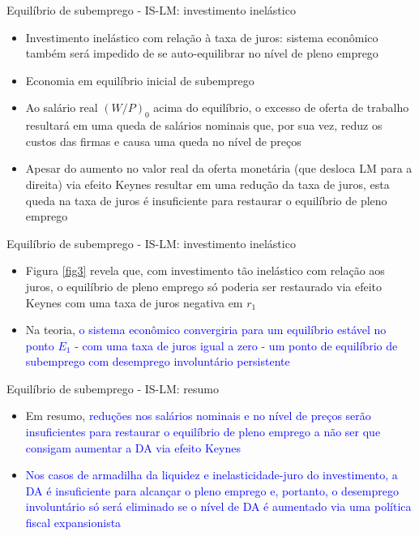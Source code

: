 \documentclass[10pt]{beamer}
\begin{document}
\begin{frame}{Equilíbrio de subemprego - IS-LM: investimento inelástico}
    \begin{itemize}
        \item Investimento inelástico com relação à taxa de juros: sistema econômico também será impedido de se auto-equilibrar no nível de pleno emprego
        \bigskip
        \item Economia em equilíbrio inicial de subemprego
        \bigskip
        \item Ao salário real $(W/P)_0$ acima do equilíbrio, o excesso de oferta de trabalho resultará em uma queda de salários nominais que, por sua vez, reduz os custos das firmas e causa uma queda no nível de preços
        \bigskip
        \item Apesar do aumento no valor real da oferta monetária (que desloca LM para a direita) via efeito Keynes resultar em uma redução da taxa de juros, esta queda na taxa de juros é insuficiente para restaurar o equilíbrio de pleno emprego
    \end{itemize}
\end{frame}

\begin{frame}{Equilíbrio de subemprego - IS-LM: investimento inelástico}
    \begin{itemize}
        \item Figura \ref{fig3} revela que, com investimento tão inelástico com relação aos juros, o equilíbrio de pleno emprego só poderia ser restaurado via efeito Keynes com uma taxa de juros negativa em $r_1$
        \bigskip
        \item Na teoria, \textcolor{blue}{o sistema econômico convergiria para um equilíbrio estável no ponto $E_1$ - com uma taxa de juros igual a zero - um ponto de equilíbrio de subemprego com desemprego involuntário persistente}
    \end{itemize}
\end{frame}

\begin{frame}{Equilíbrio de subemprego - IS-LM: resumo}
    \begin{itemize}        
        \item Em resumo, \textcolor{blue}{reduções nos salários nominais e no nível de preços serão insuficientes para restaurar o equilíbrio de pleno emprego a não ser que consigam aumentar a DA via efeito Keynes}
        \bigskip
        \item \textcolor{blue}{Nos casos de armadilha da liquidez e inelasticidade-juro do investimento, a DA é insuficiente para alcançar o pleno emprego e, portanto, o desemprego involuntário só será eliminado se o nível de DA é aumentado via uma política fiscal expansionista}
    \end{itemize}
\end{frame}
\end{document}
